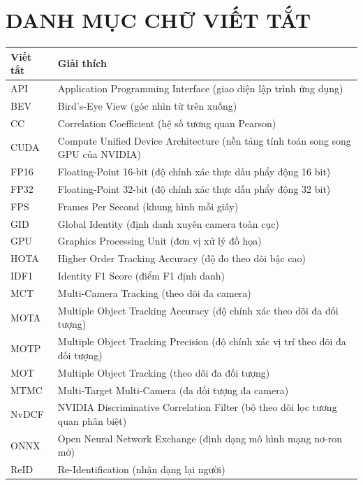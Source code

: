 \section*{DANH MỤC CHỮ VIẾT TẮT}

\begin{table}[H]
\centering
\begin{tabular}{p{3.2cm} p{13cm}}
\toprule
\textbf{Viết tắt} & \textbf{Giải thích} \\
\midrule
API      & Application Programming Interface (giao diện lập trình ứng dụng) \\
BEV      & Bird's-Eye View (góc nhìn từ trên xuống) \\
CC       & Correlation Coefficient (hệ số tương quan Pearson) \\
CUDA     & Compute Unified Device Architecture (nền tảng tính toán song song GPU của NVIDIA) \\
FP16     & Floating-Point 16-bit (độ chính xác thực dấu phẩy động 16 bit) \\
FP32     & Floating-Point 32-bit (độ chính xác thực dấu phẩy động 32 bit) \\
FPS      & Frames Per Second (khung hình mỗi giây) \\
GID      & Global Identity (định danh xuyên camera toàn cục) \\
GPU      & Graphics Processing Unit (đơn vị xử lý đồ họa) \\
HOTA     & Higher Order Tracking Accuracy (độ đo theo dõi bậc cao) \\
IDF1     & Identity F1 Score (điểm F1 định danh) \\
MCT      & Multi-Camera Tracking (theo dõi đa camera) \\
MOTA     & Multiple Object Tracking Accuracy (độ chính xác theo dõi đa đối tượng) \\
MOTP     & Multiple Object Tracking Precision (độ chính xác vị trí theo dõi đa đối tượng) \\
MOT      & Multiple Object Tracking (theo dõi đa đối tượng) \\
MTMC     & Multi-Target Multi-Camera (đa đối tượng đa camera) \\
NvDCF    & NVIDIA Discriminative Correlation Filter (bộ theo dõi lọc tương quan phân biệt) \\
ONNX     & Open Neural Network Exchange (định dạng mô hình mạng nơ-ron mở) \\
ReID     & Re-Identification (nhận dạng lại người) \\

\end{tabular}
\end{table}
